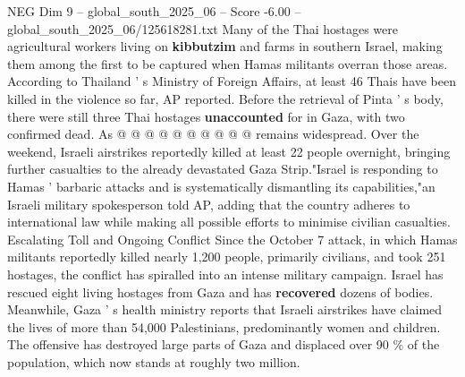 \begin{textsample}{NEG Dim 9 – global\_south\_2025\_06 – Score -6.00 – global\_south\_2025\_06/125618281.txt}
Many of the Thai hostages were agricultural workers living on \textbf{kibbutzim} and farms in southern Israel, making them among the first to be captured when Hamas militants overran those areas.
According to Thailand ' s Ministry of Foreign Affairs, at least 46 Thais have been killed in the violence so far, AP reported.
Before the retrieval of Pinta ' s body, there were still three Thai hostages \textbf{unaccounted} for in Gaza, with two confirmed dead.
As @ @ @ @ @ @ @ @ @ @ remains widespread.
Over the weekend, Israeli airstrikes reportedly killed at least 22 people overnight, bringing further casualties to the already devastated Gaza Strip."Israel is responding to Hamas ' barbaric attacks and is systematically dismantling its capabilities,"an Israeli military spokesperson told AP, adding that the country adheres to international law while making all possible efforts to minimise civilian casualties.
Escalating Toll and Ongoing Conflict Since the October 7 attack, in which Hamas militants reportedly killed nearly 1,200 people, primarily civilians, and took 251 hostages, the conflict has spiralled into an intense military campaign.
Israel has rescued eight living hostages from Gaza and has \textbf{recovered} dozens of bodies.
Meanwhile, Gaza ' s health ministry reports that Israeli airstrikes have claimed the lives of more than 54,000 Palestinians, predominantly women and children.
The offensive has destroyed large parts of Gaza and displaced over 90 \% of the population, which now stands at roughly two million.

\end{textsample}
